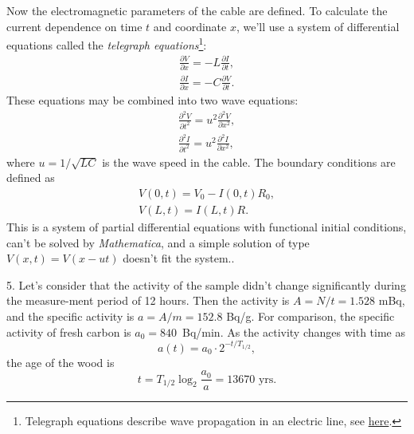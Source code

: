 \documentclass[12pt,a4paper,pdflatex]{disser}
\begin{document}
Now the electromagnetic parameters of the cable are defined. To calculate the current dependence on time $t$ and coordinate $x$, we'll use a system of differential equations called the \textit{telegraph equations}\footnote{Telegraph equations describe wave propagation in an electric line, see \href{https://en.wikipedia.org/wiki/Telegrapher's_equations}{here}.}:
\begin{gather*}
  \frac{\partial V}{\partial x}=-L\frac{\partial I}{\partial t},\\
  \frac{\partial I}{\partial x}=-C\frac{\partial V}{\partial t}.
\end{gather*}
These equations may be combined into two wave equations:
\begin{gather*}
  \frac{\partial^2 V}{\partial t^2}=u^2\frac{\partial^2 V}{\partial x^2},\\
  \frac{\partial^2 I}{\partial t^2}=u^2\frac{\partial^2 I}{\partial x^2},
\end{gather*}
where $u=1/\sqrt{LC}$ is the wave speed in the cable. The boundary conditions are defined as
\begin{gather*}
  V(0,t)=V_0-I(0,t)R_0,\\
  V(L,t)=I(L,t)R.
\end{gather*}
This is a system of partial differential equations with functional initial conditions, can't be solved by \textit{Mathematica}, and a simple solution of type $V(x,t)=V(x-ut)$ doesn't fit the system..

5. Let's consider that the activity of the sample didn't change significantly during the measure-ment period of 12 hours. Then the activity is $A=N/t=1.528$ mBq, and the specific activity is $a=A/m=152.8$ Bq/g. For comparison, the specific activity of fresh carbon is $a_0=840$~Bq/min. As the activity changes with time as
$$
  a(t)=a_0 \cdot 2^{-t/T_{1/2}},
$$
the age of the wood is
$$
  t=T_{1/2}\log_2\frac{a_0}{a}=13670 \text{ yrs}.
$$
\end{document}

